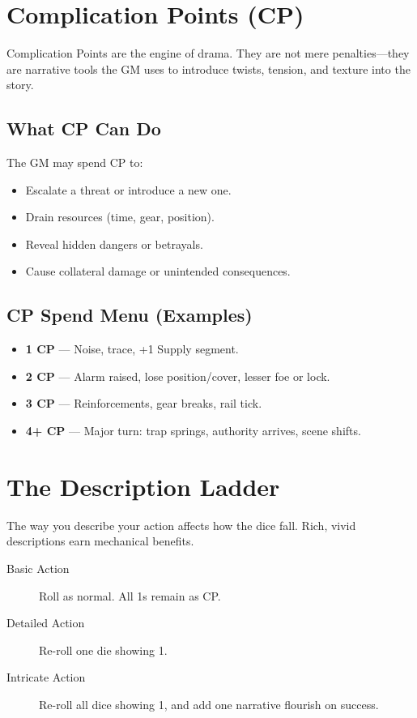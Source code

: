 \section{Complication Points (CP)}

Complication Points are the engine of drama. They are not mere penalties—they are narrative tools the GM uses to introduce twists, tension, and texture into the story.

\subsection*{What CP Can Do}

The GM may spend CP to:
\begin{itemize}
  \item Escalate a threat or introduce a new one.
  \item Drain resources (time, gear, position).
  \item Reveal hidden dangers or betrayals.
  \item Cause collateral damage or unintended consequences.
\end{itemize}

\subsection*{CP Spend Menu (Examples)}

\begin{itemize}
  \item \textbf{1 CP} — Noise, trace, +1 Supply segment.
  \item \textbf{2 CP} — Alarm raised, lose position/cover, lesser foe or lock.
  \item \textbf{3 CP} — Reinforcements, gear breaks, rail tick.
  \item \textbf{4+ CP} — Major turn: trap springs, authority arrives, scene shifts.
\end{itemize}

\section{The Description Ladder}

The way you describe your action affects how the dice fall. Rich, vivid descriptions earn mechanical benefits.

\begin{description}
  \item[Basic Action]  Roll as normal. All 1s remain as CP.
  \item[Detailed Action]  Re-roll one die showing 1.
  \item[Intricate Action]  Re-roll all dice showing 1, and add one narrative flourish on success.
\end{description}

